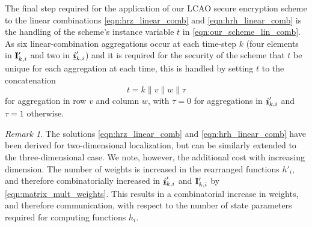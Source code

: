 \documentclass[10pt,letterpaper,oneside,twocolumn,journal]{IEEEtran}
\theoremstyle{definition}
\theoremstyle{definition}
\theoremstyle{remark}
\newtheorem*{remark}{Remark}
\begin{document}
The final step required for the application of our LCAO secure encryption scheme to the linear combinations \eqref{eqn:hrz_linear_comb} and \eqref{eqn:hrh_linear_comb} is the handling of the scheme's instance variable $t$ in \eqref{eqn:our_scheme_lin_comb}. As six linear-combination aggregations occur at each time-step $k$ (four elements in ${{\mathbf{I}}}'_{k,i}$ and two in ${\boldsymbol{\underline{i}}}'_{k,i}$) and it is required for the security of the scheme that $t$ be unique for each aggregation at each time, this is handled by setting $t$ to the concatenation 
\begin{equation}
    t=k\mathbin\|v\mathbin\|w\mathbin\|\tau
\end{equation}
for aggregation in row $v$ and column $w$, with $\tau=0$ for aggregations in ${\boldsymbol{\underline{i}}}'_{k,i}$ and $\tau=1$ otherwise.
\begin{remark}
    The solutions \eqref{eqn:hrz_linear_comb} and \eqref{eqn:hrh_linear_comb} have been derived for two-dimensional localization, but can be similarly extended to the three-dimensional case. We note, however, the additional cost with increasing dimension. The number of weights is increased in the rearranged functions $h'_i$, and therefore combinatorially increased in ${\boldsymbol{\underline{i}}}'_{k,i}$ and ${{\mathbf{I}}}'_{k,i}$ by \eqref{eqn:matrix_mult_weights}. This results in a combinatorial increase in weights, and therefore communication, with respect to the number of state parameters required for computing functions $h_i$.
\end{remark}

% 
% 
\end{document}
